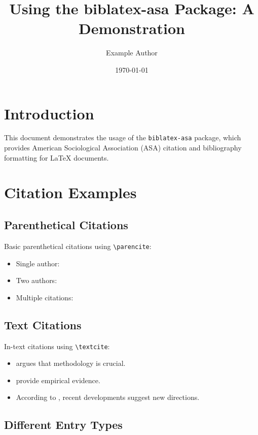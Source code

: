 \documentclass{article}
\title{Using the biblatex-asa Package: A Demonstration}
\author{Example Author}
\date{\today}
\begin{document}
\maketitle

\section{Introduction}

This document demonstrates the usage of the \texttt{biblatex-asa} package, which provides American Sociological Association (ASA) citation and bibliography formatting for LaTeX documents.

\section{Citation Examples}

\subsection{Parenthetical Citations}

Basic parenthetical citations using \verb|\parencite|:
\begin{itemize}
    \item Single author: \parencite{brown2022}
    \item Two authors: \parencite{kao2003}
    \item Multiple citations: \parencite{brown2022,kao2003,smith2020a}
\end{itemize}

\subsection{Text Citations}

In-text citations using \verb|\textcite|:
\begin{itemize}
    \item \textcite{brown2022} argues that methodology is crucial.
    \item \textcite{kao2003} provide empirical evidence.
    \item According to \textcite{smith2020a}, recent developments suggest new directions.
\end{itemize}

\subsection{Different Entry Types}
\end{document}
